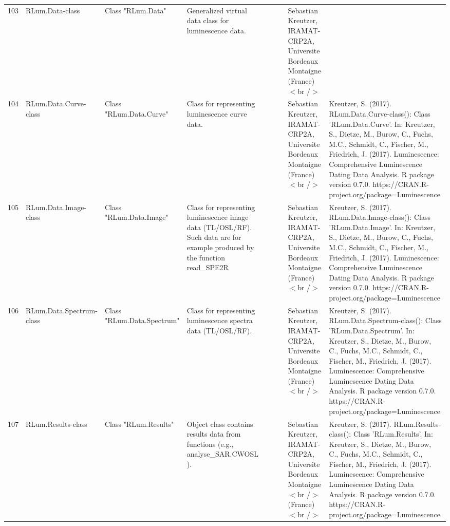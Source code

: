 \begin{table}[ht]
\begin{tabular}{rllllllll}
 \\ 
  103 & RLum.Data-class & Class  "RLum.Data" & Generalized virtual data class for luminescence data. &  &  &  & Sebastian Kreutzer, IRAMAT-CRP2A, Universite Bordeaux Montaigne (France)$<$br /$>$ &  \\ 
  104 & RLum.Data.Curve-class & Class  "RLum.Data.Curve" & Class for representing luminescence curve data. &  &  &  & Sebastian Kreutzer, IRAMAT-CRP2A, Universite Bordeaux Montaigne (France)$<$br /$>$ & Kreutzer, S. (2017). RLum.Data.Curve-class(): Class 'RLum.Data.Curve'. In: Kreutzer, S., Dietze, M., Burow, C., Fuchs, M.C., Schmidt, C., Fischer, M., Friedrich, J. (2017). Luminescence: Comprehensive Luminescence Dating Data Analysis. R package version 0.7.0. https://CRAN.R-project.org/package=Luminescence
 \\ 
  105 & RLum.Data.Image-class & Class  "RLum.Data.Image" & Class for representing luminescence image data (TL/OSL/RF). Such data are for example produced by the function  read\_SPE2R &  &  &  & Sebastian Kreutzer, IRAMAT-CRP2A, Universite Bordeaux Montaigne (France)$<$br /$>$ & Kreutzer, S. (2017). RLum.Data.Image-class(): Class 'RLum.Data.Image'. In: Kreutzer, S., Dietze, M., Burow, C., Fuchs, M.C., Schmidt, C., Fischer, M., Friedrich, J. (2017). Luminescence: Comprehensive Luminescence Dating Data Analysis. R package version 0.7.0. https://CRAN.R-project.org/package=Luminescence
 \\ 
  106 & RLum.Data.Spectrum-class & Class  "RLum.Data.Spectrum" & Class for representing luminescence spectra data (TL/OSL/RF). &  &  &  & Sebastian Kreutzer, IRAMAT-CRP2A, Universite Bordeaux Montaigne (France)$<$br /$>$ & Kreutzer, S. (2017). RLum.Data.Spectrum-class(): Class 'RLum.Data.Spectrum'. In: Kreutzer, S., Dietze, M., Burow, C., Fuchs, M.C., Schmidt, C., Fischer, M., Friedrich, J. (2017). Luminescence: Comprehensive Luminescence Dating Data Analysis. R package version 0.7.0. https://CRAN.R-project.org/package=Luminescence
 \\ 
  107 & RLum.Results-class & Class  "RLum.Results" & Object class contains results data from functions (e.g.,  analyse\_SAR.CWOSL ). &  &  &  & Sebastian Kreutzer, IRAMAT-CRP2A, Universite Bordeaux Montaigne$<$br /$>$ (France)$<$br /$>$ & Kreutzer, S. (2017). RLum.Results-class(): Class 'RLum.Results'. In: Kreutzer, S., Dietze, M., Burow, C., Fuchs, M.C., Schmidt, C., Fischer, M., Friedrich, J. (2017). Luminescence: Comprehensive Luminescence Dating Data Analysis. R package version 0.7.0. https://CRAN.R-project.org/package=Luminescence

\end{tabular}
\end{table}
